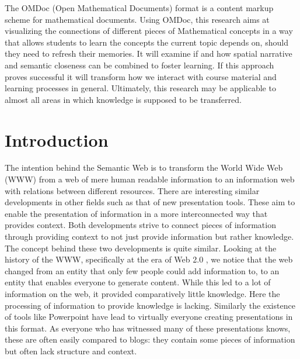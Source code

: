 \documentclass[twoside]{article}
\begin{document}
The OMDoc (Open Mathematical Documents) format \cite{Kohlhase:OMDoc1.2} is a content markup scheme for mathematical documents. Using OMDoc, this research aims at visualizing the connections of different pieces of Mathematical concepts in a way that allows students to learn the concepts the current topic depends on, should they need to refresh their memories. It will examine if and how spatial narrative and semantic closeness can be combined to foster learning. If this approach proves successful it will transform how we interact with course material and learning processes in general. Ultimately, this research may be applicable to almost all areas in which knowledge is supposed to be transferred.\\ 

  \newpage
  \tableofcontents

  \clearpage

  \section{Introduction}
  \label{sec:introduction}

The intention behind the Semantic Web \cite{BernersLee:tsw98} is to transform the World Wide Web (WWW) from a web of mere human readable information to an information web with relations between different resources. There are interesting similar developments in other fields such as that of new presentation tools. These aim to enable the presentation of information in a more interconnected way that provides context. Both developments strive to connect pieces of information through providing context to not just provide information but rather knowledge.\\

The concept behind these two developments is quite similar. Looking at the history of the WWW, specifically at the era of Web 2.0 \cite{Weller:npentrel14}, we notice that the web changed from an entity that only few people could add information to, to an entity that enables everyone to generate content. While this led to a lot of information on the web, it provided comparatively little knowledge. Here the processing of information to provide knowledge is lacking. Similarly the existence of tools like Powerpoint have lead to virtually everyone creating presentations in this format. As everyone who has witnessed many of these presentations knows, these are often easily compared to blogs: they contain some pieces of information but often lack structure and context.\\
\end{document}
